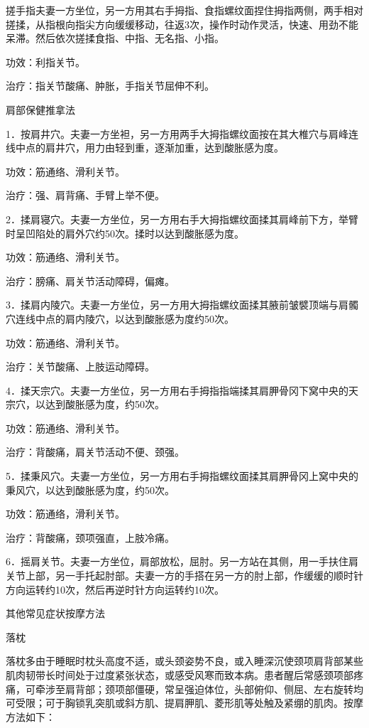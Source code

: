 \documentclass[12pt,UTF8]{ctexbook}
\begin{document}
搓手指夫妻一方坐位，另一方用其右手拇指、食指螺纹面捏住拇指两侧，两手相对搓揉，从指根向指尖方向缓缓移动，往返3次，操作时动作灵活，快速、用劲不能呆滞。然后依次搓揉食指、中指、无名指、小指。

功效：利指关节。

治疗：指关节酸痛、肿胀，手指关节屈伸不利。





肩部保健推拿法


1．按肩井穴。夫妻一方坐袒，另一方用两手大拇指螺纹面按在其大椎穴与肩峰连线中点的肩井穴，用力由轻到重，逐渐加重，达到酸胀感为度。

功效：筋通络、滑利关节。

治疗：强、肩背痛、手臂上举不便。

2．揉肩寝穴。夫妻一方坐位，另一方用右手大拇指螺纹面揉其肩峰前下方，举臂时呈凹陷处的肩外穴约50次。揉时以达到酸胀感为度。

功效：筋通络、滑利关节。

治疗：膀痛、肩关节活动障碍，偏瘫。

3．揉肩内陵穴。夫妻一方坐位，另一方用大拇指螺纹面揉其腋前皱襞顶端与肩髑穴连线中点的肩内陵穴，以达到酸胀感为度约50次。

功效：筋通络、滑利关节。

治疗：关节酸痛、上肢运动障碍。

4．揉天宗穴。夫妻一方坐位，另一方用右手拇指指端揉其肩胛骨冈下窝中央的天宗穴，以达到酸胀感为度，约50次。

功效：筋通络、滑利关节。

治疗：背酸痛，肩关节活动不便、颈强。

5．揉秉风穴。夫妻一方坐位，另一方用右手拇指螺纹面揉其肩胛骨冈上窝中央的秉风穴，以达到酸胀感为度，约50次。

功效：筋通络，滑利关节。

治疗：背酸痛，颈项强直，上肢冷痛。

6．摇肩关节。夫妻一方坐位，肩部放松，屈肘。另一方站在其侧，用一手扶住肩关节上部，另一手托起肘部。夫妻一方的手搭在另一方的肘上部，作缓缓的顺时针方向运转约10次，然后再逆时针方向运转约10次。





其他常见症状按摩方法


落枕

落枕多由于睡眠时枕头高度不适，或头颈姿势不良，或入睡深沉使颈项肩背部某些肌肉韧带长时间处于过度紧张状态，或感受风寒而致本病。患者醒后常感颈项部疼痛，可牵涉至肩背部；颈项部僵硬，常呈强迫体位，头部俯仰、侧屈、左右旋转均可受限；可于胸锁乳突肌或斜方肌、提肩胛肌、菱形肌等处触及紧绷的肌肉。按摩方法如下：
\end{document}
